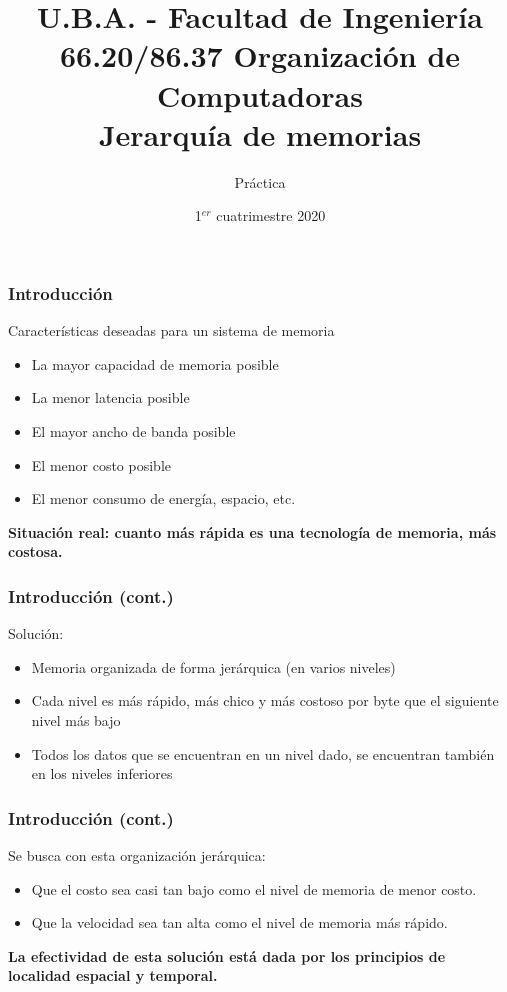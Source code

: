 \documentclass{beamer}
\title[66.20/86.37]{U.B.A. - Facultad de Ingeniería\\\vspace{0.25cm} 66.20/86.37 Organización de Computadoras
\\Jerarquía de memorias}
\author{Práctica}
\date{1$^{er}$ cuatrimestre 2020}
\begin{document}
\begin{frame}
\titlepage %
\end{frame}

\begin{frame}
 \frametitle{Introducción}
Características deseadas para un sistema de memoria
    
    \begin{itemize}
      \item La mayor capacidad de memoria posible
      \item La menor latencia posible
      \item El mayor ancho de banda posible
      \item El menor costo posible
      \item El menor consumo de energía, espacio, etc.
    \end{itemize}
    \bigskip
        \textbf{Situación real: cuanto más rápida es una tecnología de memoria,
    más costosa.}
\end{frame}

  \begin{frame}
   
\frametitle{Introducción (cont.)}
    Solución:
    \begin{itemize}
      \item Memoria organizada de forma jerárquica (en varios niveles)
      \item Cada nivel es más rápido, más chico y más costoso por byte que el
      siguiente nivel más bajo
      \item Todos los datos que se encuentran en un nivel dado, se encuentran
      también en los niveles inferiores
    \end{itemize}
    \end{frame}

\begin{frame}
\frametitle{Introducción (cont.)}
    Se busca con esta organización jerárquica:
    \begin{itemize}
      \item Que el costo sea casi tan bajo como el nivel de memoria de menor
      costo.
      \item Que la velocidad sea tan alta como el nivel de memoria más rápido.
    \end{itemize}
    \bigskip

    \textbf{La efectividad de esta solución está dada por los principios de
    localidad espacial y temporal.}
\end{frame}
\end{document}
